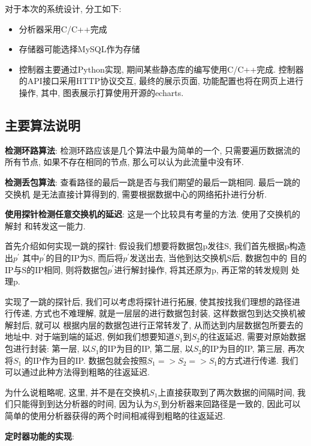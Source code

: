 {\begin{mdframed}[everyline=true]
对于本次的系统设计, 分工如下:
\begin{itemize}
    \setlength\itemsep{0.1em}
    \item 分析器采用C/C++完成
    \item 存储器可能选择MySQL作为存储
    \item 控制器主要通过Python实现, 期间某些静态库的编写使用C/C++完成.
            控制器的API接口采用HTTP协议交互, 最终的展示页面,
            功能配置也将在网页上进行操作, 其中, 图表展示打算使用开源的echarts.
\end{itemize}


\subsection{主要算法说明}\label{主要算法说明}

\textbf{检测环路算法}: 检测环路应该是几个算法中最为简单的一个,
只需要遍历数据流的所有节点, 如果不存在相同的节点,
那么可以认为此流量中没有环.

\textbf{检测丢包算法}: 查看路径的最后一跳是否与我们期望的最后一跳相同.
最后一跳的交换机 是无法直接计算得到的,
需要根据数据中心的网络拓扑进行分析.

\textbf{使用探针检测任意交换机的延迟}: 这是一个比较具有考量的方法.
使用了交换机的解封 和转发这一能力.

首先介绍如何实现一跳的探针: 假设我们想要将数据包p发往S,
我们首先根据p构造出\(p^{'}\) 其中\(p^{'}\)的目的IP为S,
而后将\(p^{'}\)发送出去, 当他到达交换机S后, 数据包中的
目的IP与S的IP相同, 则将数据包\(p^{'}\)进行解封操作, 将其还原为p,
再正常的转发规则 处理p.

实现了一跳的探针后, 我们可以考虑将探针进行拓展,
使其按找我们理想的路径进行传递, 方式也不难理解,
就是一层层的进行数据包封装, 这样数据包到达交换机被解封后, 就可以
根据内层的数据包进行正常转发了, 从而达到内层数据包所要去的地址中.
对于端到端的延迟, 例如我们想要知道\(S_{1}\)到\(S_{2}\)的往返延迟,
需要对原始数据包进行封装: 第一层, 以\(S_{1}\)的IP为目的IP, 第二层,
以\(S_{2}\)的IP为目的IP, 第三层, 再次将\(S_{1}\) 的IP作为目的IP.
数据包就会按照\(S_{1} => S_{2} => S_{1}\)的方式进行传递. 我们
可以通过此种方法得到粗略的往返延迟.

为什么说粗略呢, 这里,
并不是在交换机\(S_{1}\)上直接获取到了两次数据的间隔时间,
我们只能得到到达分析器的时间, 因为认为\(S_{1}\)到分析器来回路径是一致的,
因此可以 简单的使用分析器获得的两个时间相减得到粗略的往返延迟.

\textbf{定时器功能的实现}:


\end{mdframed}}
